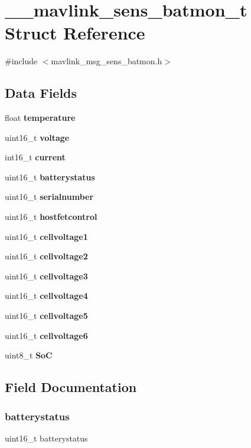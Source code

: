 \section{\+\_\+\+\_\+mavlink\+\_\+sens\+\_\+batmon\+\_\+t Struct Reference}
\label{struct____mavlink__sens__batmon__t}


{\ttfamily \#include $<$mavlink\+\_\+msg\+\_\+sens\+\_\+batmon.\+h$>$}

\subsection*{Data Fields}
\begin{DoxyCompactItemize}
\item 
float \textbf{ temperature}
\item 
uint16\+\_\+t \textbf{ voltage}
\item 
int16\+\_\+t \textbf{ current}
\item 
uint16\+\_\+t \textbf{ batterystatus}
\item 
uint16\+\_\+t \textbf{ serialnumber}
\item 
uint16\+\_\+t \textbf{ hostfetcontrol}
\item 
uint16\+\_\+t \textbf{ cellvoltage1}
\item 
uint16\+\_\+t \textbf{ cellvoltage2}
\item 
uint16\+\_\+t \textbf{ cellvoltage3}
\item 
uint16\+\_\+t \textbf{ cellvoltage4}
\item 
uint16\+\_\+t \textbf{ cellvoltage5}
\item 
uint16\+\_\+t \textbf{ cellvoltage6}
\item 
uint8\+\_\+t \textbf{ SoC}
\end{DoxyCompactItemize}


\subsection{Field Documentation}
\mbox{\label{struct____mavlink__sens__batmon__t_af8f3d27e686c88e9029a0c4cd0464317}} 
\subsubsection{batterystatus}
{\footnotesize\ttfamily uint16\+\_\+t batterystatus}

